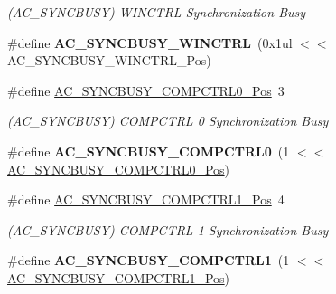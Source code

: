 \begin{DoxyCompactItemize}
\begin{DoxyCompactList}\small\item\em (A\+C\+\_\+\+S\+Y\+N\+C\+B\+U\+S\+Y) W\+I\+N\+C\+T\+R\+L Synchronization Busy \end{DoxyCompactList}\item 
\hypertarget{group___s_a_m_l21___a_c_gaf43ea77f3623743338e5cf59db737c8c}{}\#define {\bfseries A\+C\+\_\+\+S\+Y\+N\+C\+B\+U\+S\+Y\+\_\+\+W\+I\+N\+C\+T\+R\+L}~(0x1ul $<$$<$ A\+C\+\_\+\+S\+Y\+N\+C\+B\+U\+S\+Y\+\_\+\+W\+I\+N\+C\+T\+R\+L\+\_\+\+Pos)\label{group___s_a_m_l21___a_c_gaf43ea77f3623743338e5cf59db737c8c}

\item 
\hypertarget{group___s_a_m_l21___a_c_gab453d4ad66ae224e4dc090f1b824d463}{}\#define \hyperlink{group___s_a_m_l21___a_c_gab453d4ad66ae224e4dc090f1b824d463}{A\+C\+\_\+\+S\+Y\+N\+C\+B\+U\+S\+Y\+\_\+\+C\+O\+M\+P\+C\+T\+R\+L0\+\_\+\+Pos}~3\label{group___s_a_m_l21___a_c_gab453d4ad66ae224e4dc090f1b824d463}

\begin{DoxyCompactList}\small\item\em (A\+C\+\_\+\+S\+Y\+N\+C\+B\+U\+S\+Y) C\+O\+M\+P\+C\+T\+R\+L 0 Synchronization Busy \end{DoxyCompactList}\item 
\hypertarget{group___s_a_m_l21___a_c_ga0cf7cc10ae3637f239589ae34d19ddc5}{}\#define {\bfseries A\+C\+\_\+\+S\+Y\+N\+C\+B\+U\+S\+Y\+\_\+\+C\+O\+M\+P\+C\+T\+R\+L0}~(1 $<$$<$ \hyperlink{group___s_a_m_l21___a_c_gab453d4ad66ae224e4dc090f1b824d463}{A\+C\+\_\+\+S\+Y\+N\+C\+B\+U\+S\+Y\+\_\+\+C\+O\+M\+P\+C\+T\+R\+L0\+\_\+\+Pos})\label{group___s_a_m_l21___a_c_ga0cf7cc10ae3637f239589ae34d19ddc5}

\item 
\hypertarget{group___s_a_m_l21___a_c_ga8adb9efe1160b8939c9c7dcdb13b97d8}{}\#define \hyperlink{group___s_a_m_l21___a_c_ga8adb9efe1160b8939c9c7dcdb13b97d8}{A\+C\+\_\+\+S\+Y\+N\+C\+B\+U\+S\+Y\+\_\+\+C\+O\+M\+P\+C\+T\+R\+L1\+\_\+\+Pos}~4\label{group___s_a_m_l21___a_c_ga8adb9efe1160b8939c9c7dcdb13b97d8}

\begin{DoxyCompactList}\small\item\em (A\+C\+\_\+\+S\+Y\+N\+C\+B\+U\+S\+Y) C\+O\+M\+P\+C\+T\+R\+L 1 Synchronization Busy \end{DoxyCompactList}\item 
\hypertarget{group___s_a_m_l21___a_c_gae629dc4c62e6f24da82a620ea5dff1c0}{}\#define {\bfseries A\+C\+\_\+\+S\+Y\+N\+C\+B\+U\+S\+Y\+\_\+\+C\+O\+M\+P\+C\+T\+R\+L1}~(1 $<$$<$ \hyperlink{group___s_a_m_l21___a_c_ga8adb9efe1160b8939c9c7dcdb13b97d8}{A\+C\+\_\+\+S\+Y\+N\+C\+B\+U\+S\+Y\+\_\+\+C\+O\+M\+P\+C\+T\+R\+L1\+\_\+\+Pos})\label{group___s_a_m_l21___a_c_gae629dc4c62e6f24da82a620ea5dff1c0}


\end{DoxyCompactItemize}
